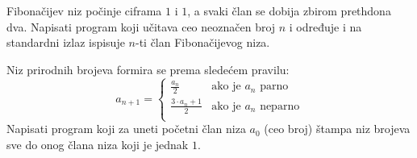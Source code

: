 \begin{Exercise}[label=p1.4_] 
Fibonačijev niz počinje ciframa $1$ i $1$, a svaki član se dobija zbirom
prethdona dva. Napisati program koji učitava ceo neoznačen broj $n$ i
određuje i na standardni izlaz ispisuje $n$-ti član Fibonačijevog niza. \\
\end{Exercise}
\begin{Answer}[ref=p1.4_]
\end{Answer}


\begin{Exercise}[difficulty=1, label=v1.3_09] 
Niz prirodnih brojeva formira se prema sledećem pravilu:
\begin{equation*}
a_{n+1} = \left\{
\begin{array}{rl}
\frac{a_n}{2} & \text{ako je } a_n \text{ parno}\\
\frac{3\cdot a_n + 1}{2} & \text{ako je } a_n \text{ neparno}\\
\end{array} \right.
\end{equation*}
Napisati program koji za uneti početni član niza $a_0$ (ceo broj)
štampa niz brojeva sve do onog člana niza koji je jednak $1$.
\end{Exercise}
\begin{Answer}[ref=v1.3_09]
\end{Answer}


